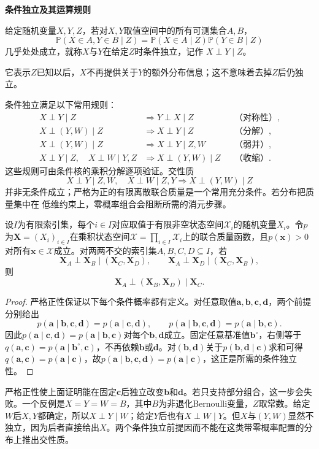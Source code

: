 \par\medskip\noindent\textbf{条件独立及其运算规则}\quad
\begin{definition}[条件独立]
  \label{def:probability-conditional-independence}
  给定随机变量\(X,Y,Z\)，若对\(X,Y\)取值空间中的所有可测集合\(A,B\)，
\[ \mathbb{P}(X\in A,Y\in B\mid Z)
  =\mathbb{P}(X\in A\mid Z)\mathbb{P}(Y\in B\mid Z) \]
几乎处处成立，就称\(X\)与\(Y\)在给定\(Z\)时条件独立，记作
\(X\perp Y\mid Z\)。
\end{definition}
它表示\(Z\)已知以后，\(X\)不再提供关于\(Y\)的额外分布信息；这不意味着去掉\(Z\)后仍独立。

条件独立满足以下常用规则：
\[
\begin{aligned}
  X\perp Y\mid Z
  &\Longrightarrow Y\perp X\mid Z
  &&\text{（对称性）},\\
  X\perp(Y,W)\mid Z
  &\Longrightarrow X\perp Y\mid Z
  &&\text{（分解）},\\
  X\perp(Y,W)\mid Z
  &\Longrightarrow X\perp Y\mid Z,W
  &&\text{（弱并）},\\
  X\perp Y\mid Z,\quad X\perp W\mid Y,Z
  &\Longrightarrow X\perp(Y,W)\mid Z
  &&\text{（收缩）}.
\end{aligned}
\]
这些规则可由条件核的乘积分解逐项验证。交性质
\[ X\perp Y\mid Z,W,\quad
  X\perp W\mid Z,Y\Longrightarrow X\perp(Y,W)\mid Z \]
并非无条件成立；严格为正的有限离散联合质量是一个常用充分条件。若分布把质量集中在
低维约束上，零概率组合会阻断所需的消元步骤。

\begin{lemma}[严格正离散分布的交性质]
  \label{lem:probability-positive-intersection}
  设$I$为有限索引集，每个$i\in I$对应取值于有限非空状态空间$\mathcal{X}_i$的随机变量$X_i$。令$p$为$\bm{X}=(X_i)_{i\in I}$在乘积状态空间$\mathcal{X}=\prod_{i\in I}\mathcal{X}_i$上的联合质量函数，且$p(\bm{x})>0$对所有$\bm{x}\in\mathcal{X}$成立。对两两不交的索引集$A,B,C,D\subseteq I$，若
  \[
    \bm{X}_A\perp\bm{X}_B\mid(\bm{X}_C,\bm{X}_D),
    \qquad
    \bm{X}_A\perp\bm{X}_D\mid(\bm{X}_C,\bm{X}_B),
  \]
  则
  \[
    \bm{X}_A\perp(\bm{X}_B,\bm{X}_D)\mid\bm{X}_C.
  \]
\end{lemma}

\begin{proof}
严格正性保证以下每个条件概率都有定义。对任意取值$\bm{a},\bm{b},\bm{c},\bm{d}$，两个前提分别给出
\[
  p(\bm{a}\mid\bm{b},\bm{c},\bm{d})
  =p(\bm{a}\mid\bm{c},\bm{d}),
  \qquad
  p(\bm{a}\mid\bm{b},\bm{c},\bm{d})
  =p(\bm{a}\mid\bm{b},\bm{c}).
\]
因此$p(\bm{a}\mid\bm{c},\bm{d})=p(\bm{a}\mid\bm{b},\bm{c})$对每个$\bm{b},\bm{d}$成立。固定任意基准值$\bm{b}^{\circ}$，右侧等于$q(\bm{a},\bm{c})=p(\bm{a}\mid\bm{b}^{\circ},\bm{c})$，不再依赖$\bm{b}$或$\bm{d}$。对$(\bm{b},\bm{d})$关于$p(\bm{b},\bm{d}\mid\bm{c})$求和可得$q(\bm{a},\bm{c})=p(\bm{a}\mid\bm{c})$，故$p(\bm{a}\mid\bm{b},\bm{c},\bm{d})=p(\bm{a}\mid\bm{c})$，这正是所需的条件独立性。
\end{proof}
严格正性使上面证明能在固定\(\bm c\)后独立改变\(\bm b\)和\(\bm d\)。若只支持部分组合，这一步会失败。一个反例是\(X=Y=W=B\)，其中\(B\)为非退化Bernoulli变量，\(Z\)取常数。给定\(W\)后\(X,Y\)都确定，所以\(X\perp Y\mid W\)；给定\(Y\)后也有\(X\perp W\mid Y\)。但\(X\)与\((Y,W)\)显然不独立，因为后者直接给出\(X\)。两个条件独立前提因而不能在这类带零概率配置的分布上推出交性质。

